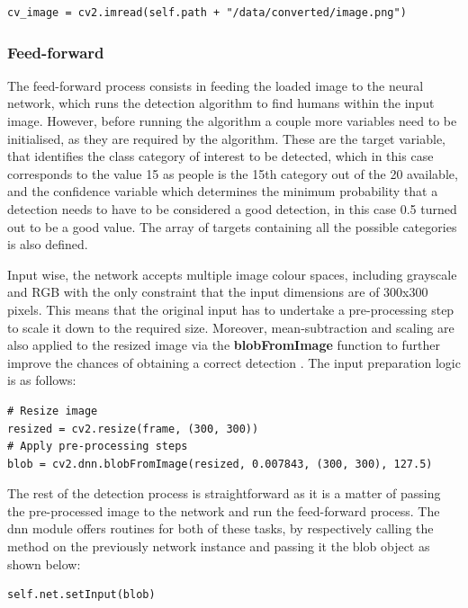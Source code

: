\begin{lstlisting}
cv_image = cv2.imread(self.path + "/data/converted/image.png")
\end{lstlisting}

\subsubsection{Feed-forward}

The feed-forward process consists in feeding the loaded image to the neural network, which runs the detection algorithm to find humans within the input image. However, before running the algorithm a couple more variables need to be initialised, as they are required by the algorithm. These are the target variable, that identifies the class category of interest to be detected, which in this case corresponds to the value 15 as people is the 15th category out of the 20 available, and the confidence variable which determines the minimum probability that a detection needs to have to be considered a good detection, in this case 0.5 turned out to be a good value. The array of targets containing all the possible categories is also defined.

Input wise, the network accepts multiple image colour spaces, including grayscale and RGB with the only constraint that the input dimensions are of 300x300 pixels. This means that the original input has to undertake a pre-processing step to scale it down to the required size. Moreover, mean-subtraction and scaling are also applied to the resized image via the \textbf{blobFromImage} function to further improve the chances of obtaining a correct detection \cite{website:blobFromImage}. The input preparation logic is as follows:

\begin{lstlisting}
# Resize image
resized = cv2.resize(frame, (300, 300))
# Apply pre-processing steps
blob = cv2.dnn.blobFromImage(resized, 0.007843, (300, 300), 127.5)
\end{lstlisting}

The rest of the detection process is straightforward as it is a matter of passing the pre-processed image to the network and run the feed-forward process. The dnn module offers routines for both of these tasks, by respectively calling the \cite{setInput} method on the previously network instance and passing it the blob object as shown below:

\begin{lstlisting}
self.net.setInput(blob)
\end{lstlisting}

